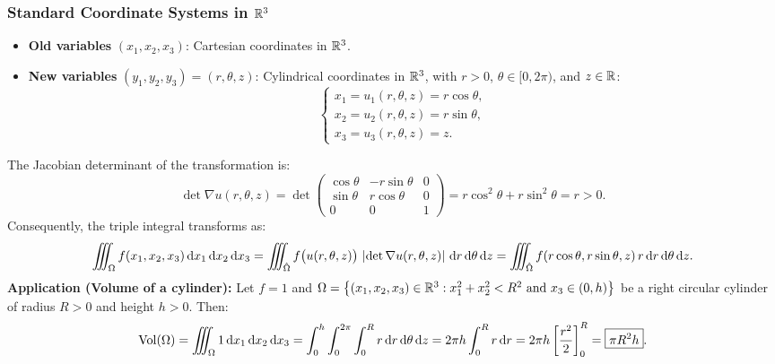 \subsubsection{Standard Coordinate Systems in $\mathbb{R}^3$}

\begin{exemple}
\begin{itemize}
    \item \textbf{Old variables} $(x_1, x_2, x_3)$: Cartesian coordinates in $\mathbb{R}^3$.
    \item \textbf{New variables} $(y_1, y_2, y_3) = (r, \theta, z)$: Cylindrical coordinates in $\mathbb{R}^3$, with $r > 0$, $\theta \in [0, 2\pi)$, and $z \in \mathbb{R}$:
    \[
        \begin{cases}
            x_1 = u_1(r, \theta, z) = r \cos\theta, \\
            x_2 = u_2(r, \theta, z) = r \sin\theta, \\
            x_3 = u_3(r, \theta, z) = z.
        \end{cases}
    \]
\end{itemize}
The Jacobian determinant of the transformation is:
\[
    \det \nabla u(r, \theta, z) = \det \begin{pmatrix}
        \cos\theta & -r \sin\theta & 0 \\
        \sin\theta & r \cos\theta & 0 \\
        0 & 0 & 1
    \end{pmatrix} = r \cos^2\theta + r \sin^2\theta = r > 0.
\]
Consequently, the triple integral transforms as:
\[
    \iiint_{\Omega} f(x_1, x_2, x_3) \,\mathrm{d}x_1\,\mathrm{d}x_2\,\mathrm{d}x_3 = \iiint_{\hat{\Omega}} f\big(u(r, \theta, z)\big) \, \left\lvert\det \nabla u(r, \theta, z)\right\rvert \,\mathrm{d}r\,\mathrm{d}\theta\,\mathrm{d}z = \iiint_{\hat{\Omega}} f(r \cos\theta, r \sin\theta, z) \, r \,\mathrm{d}r\,\mathrm{d}\theta\,\mathrm{d}z.
\]
\textbf{Application (Volume of a cylinder):} Let $f = 1$ and $\Omega = \left\{(x_1, x_2, x_3) \in \mathbb{R}^3 : x_1^2 + x_2^2 < R^2 \text{ and } x_3 \in (0, h)\right\}$ be a right circular cylinder of radius $R > 0$ and height $h > 0$. Then:
\[
    \operatorname{Vol}(\Omega) = \iiint_{\Omega} 1 \,\mathrm{d}x_1\,\mathrm{d}x_2\,\mathrm{d}x_3 = \int_{0}^{h} \int_{0}^{2\pi} \int_{0}^{R} r \,\mathrm{d}r\,\mathrm{d}\theta\,\mathrm{d}z = 2\pi h \int_{0}^{R} r \,\mathrm{d}r = 2\pi h \left[ \frac{r^2}{2} \right]_{0}^{R} = \boxed{\pi R^2 h}.
\]
\end{exemple}

